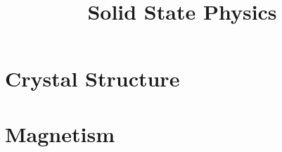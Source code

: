 \documentclass[11pt,a4paper]{book}
\title{Solid State Physics}
\begin{document}
\maketitle
\chapter{Crystal Structure}

\chapter{Magnetism}

\end{document}
